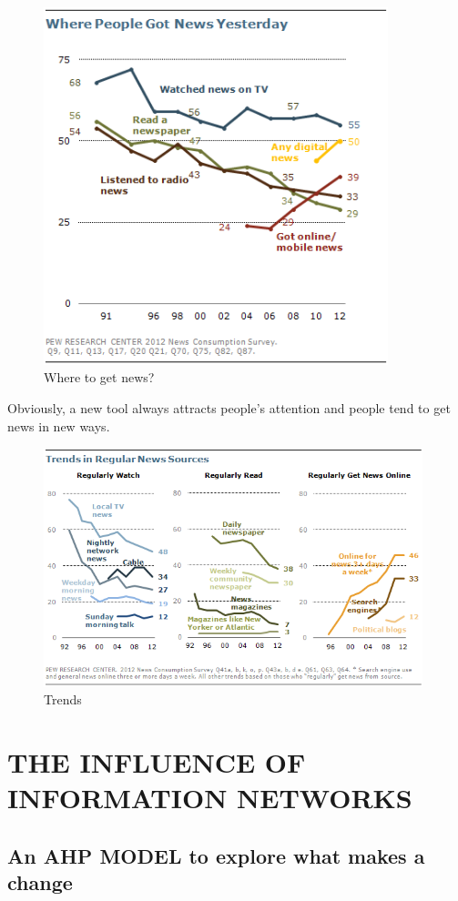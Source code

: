 \begin{figure}[h]
	\small
	\centering
	\includegraphics[width=10cm]{./picture/lala.png}
	\caption{Where to get news?}
	\label{fig:Where to get news?}
\end{figure}
\par Obviously, a new tool always attracts people's attention and people tend to get news in new ways.
\begin{figure}[h]
	\small
	\centering
	\includegraphics[width=11cm]{./picture/lala2.png}
	\caption{Trends}
	\label{fig:Trends}
\end{figure}



\section{THE INFLUENCE OF INFORMATION NETWORKS}
\subsection{An AHP MODEL to explore what makes a change}

